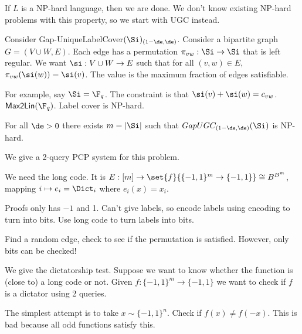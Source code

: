 

If $L$ is a NP-hard language, then we are done. We don't know existing NP-hard problems with this property, so we start with UGC instead.

Consider Gap-UniqueLabelCover$(\Si)_{(1-\de,\de)}$. Consider a bipartite graph $G=(V\cup W,E)$.  Each edge has a permutation $\pi_{vw}:\Si\to \Si$ that is left regular. We want $\si:V\cup W\to E$ such that for all $(v,w)\in E$, $\pi_{vw}(\si(w))=\si(v)$.  The value is the maximum fraction of edges satisfiable.

For example, say $\Si=\F_q$. The constraint is that $\si(v)+\si(w)=c_{vw}$. $\mathsf{Max2Lin}(\F_q)$.
Label cover is NP-hard.


\begin{conj}
For all $\de>0$ there exists $m=|\Si|$ such that $GapUGC_{(1-\de,\de)}(\Si)$ is NP-hard.

\end{conj}

We give a 2-query PCP system for this problem.

We need the long code. It is $E:[m]\to \set{f}{\{-1,1\}^m\to \{-1,1\}}\cong B^{B^m}$, mapping $i\mapsto e_i=\Dict_i$ where $e_i(x)=x_i$.

Proofs only has $-1$ and 1. Can't give labels, so encode labels using encoding to turn into bits. Use long code to turn labels into bits.

Find a random edge, check to see if the permutation is satisfied. However, only bits can be checked!

We give the dictatorship test.
Suppose we want to know whether the function is (close to) a long code or not.
Given $f:\{-1,1\}^m\to \{-1,1\}$ we want to check if $f$ is a dictator using 2 queries.

The simplest attempt is to take $x\sim \{-1,1\}^n$. Check if $f(x)\ne f(-x)$. This is bad because all odd functions satisfy this.

